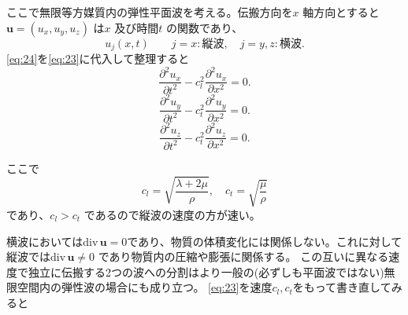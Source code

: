 \documentclass[dvipdfmx]{jsreport}
\numberwithin{equation}{chapter}
\numberwithin{table}{chapter}
\begin{document}
ここで無限等方媒質内の弾性平面波を考える。伝搬方向を$x$ 軸方向とすると
$\bm{u}=(u_x,u_y,u_z)$ は$x$ 及び時間$t$ の関数であり、
\begin{equation}
\label{eq:24}
	u_j(x,t)\qquad j=x:\text{縦波},\quad j=y,z:\text{横波}
.\end{equation}
\eqref{eq:24}を\eqref{eq:23}に代入して整理すると
\begin{equation}
\label{eq:25}
	\frac{\partial ^2u_x}{\partial t^2} -c_l^2 \frac{\partial ^2u_x}{\partial x^2} =0.\end{equation}
\begin{equation}
\label{eq:26}
	\frac{\partial ^2u_y}{\partial t^2} -c_t^2 \frac{\partial ^2u_y}{\partial x^2} =0
.\end{equation}
\begin{equation}
\label{eq:27}
	\frac{\partial ^2u_z}{\partial t^2} -c_t^2 \frac{\partial ^2u_z}{\partial x^2} =0.\end{equation}

ここで
\begin{equation}
\label{eq:28}
	c_l=\sqrt{\frac{\lambda+2\mu}{\rho}} ,\quad c_t=\sqrt{\frac{\mu}{\rho}} 
\end{equation}
であり、$c_l>c_t$ であるので縦波の速度の方が速い。

横波においては$\mathrm{div}\,\bm{u}=0$であり、物質の体積変化には関係しない。これに対して縦波では$\mathrm{div}\,\bm{u}\neq 0$
であり物質内の圧縮や膨張に関係する。
この互いに異なる速度で独立に伝搬する2つの波への分割はより一般の(必ずしも平面波ではない)無限空間内の弾性波の場合にも成り立つ。
\eqref{eq:23}を速度$c_l,c_t$をもって書き直してみると
\end{document}
